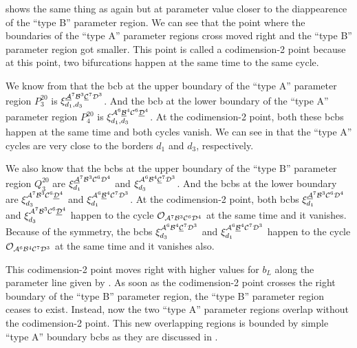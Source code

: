  shows the same thing as  again but at parameter value closer to the diappearence of the ``type B'' parameter region.
We can see that the point where the boundaries of the ``type A'' parameter regions cross moved right and the ``type B'' parameter region got smaller.
This point is called a codimension-2 point because at this point, two bifurcations happen at the same time to the same cycle.

We know from  that the \gls{bcb} at the upper boundary of the ``type A'' parameter region $P^{20}_3$ is $\xi_{d_1, d_3}^{\underline{\mathcal{A}}^7\mathcal{B}^3\underline{\mathcal{C}}^7\mathcal{D}^3}$.
And the \gls{bcb} at the lower boundary of the ``type A'' parameter region $P^{20}_4$ is $\xi_{d_1, d_3}^{\mathcal{A}^6\underline{\mathcal{B}}^4\mathcal{C}^6\underline{\mathcal{D}}^4}$.
At the codimension-2 point, both these \glspl{bcb} happen at the same time and both cycles vanish.
We can see in  that the ``type A'' cycles are very close to the borders $d_1$ and $d_3$, respectively.

We also know that the \glspl{bcb} at the upper boundary of the ``type B'' parameter region $Q^{20}_3$ are $\xi_{d_1}^{\underline{\mathcal{A}}^7\mathcal{B}^3\mathcal{C}^6\mathcal{D}^4}$ and $\xi_{d_3}^{\mathcal{A}^6\mathcal{B}^4\underline{\mathcal{C}}^7\mathcal{D}^3}$.
And the \glspl{bcb} at the lower boundary are $\xi_{d_3}^{\mathcal{A}^7\mathcal{B}^3\mathcal{C}^6\underline{\mathcal{D}}^4}$ and $\xi_{d_1}^{\mathcal{A}^6\underline{\mathcal{B}}^4\mathcal{C}^7\mathcal{D}^3}$.
At the codimension-2 point, both \glspl{bcb} $\xi_{d_1}^{\underline{\mathcal{A}}^7\mathcal{B}^3\mathcal{C}^6\mathcal{D}^4}$ and $\xi_{d_3}^{\mathcal{A}^7\mathcal{B}^3\mathcal{C}^6\underline{\mathcal{D}}^4}$ happen to the cycle $\mathcal{O}_{\mathcal{A}^7\mathcal{B}^3\mathcal{C}^6\mathcal{D}^4}$ at the same time and it vanishes.
Because of the symmetry, the \glspl{bcb} $\xi_{d_3}^{\mathcal{A}^6\mathcal{B}^4\underline{\mathcal{C}}^7\mathcal{D}^3}$ and $\xi_{d_1}^{\mathcal{A}^6\underline{\mathcal{B}}^4\mathcal{C}^7\mathcal{D}^3}$ happen to the cycle $\mathcal{O}_{\mathcal{A}^6\mathcal{B}^4\mathcal{C}^7\mathcal{D}^3}$ at the same time and it vanishes also.

This codimension-2 point moves right with higher values for $b_L$ along the parameter line given by .
As soon as the codimension-2 point crosses the right boundary of the ``type B'' parameter region, the ``type B'' parameter region ceases to exist.
Instead, now the two ``type A'' parameter regions overlap without the codimension-2 point.
This new overlapping regions is bounded by simple ``type A'' boundary \glspl{bcb} as they are discussed in .
